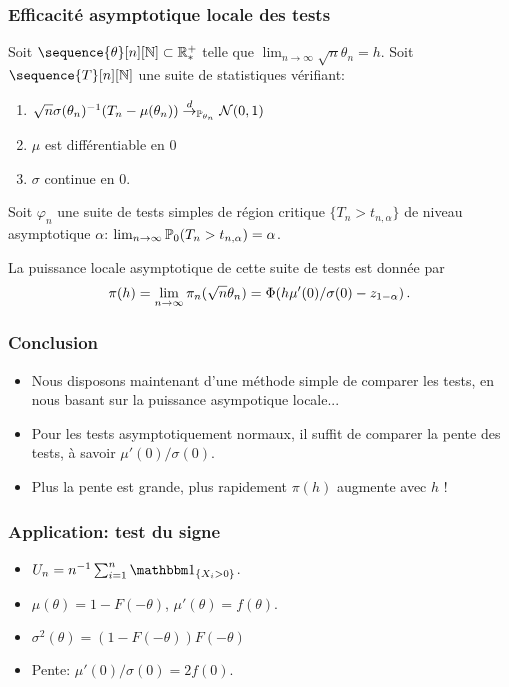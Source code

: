 \begin{frame}
\frametitle{Efficacité asymptotique locale des tests}
\begin{theo}
Soit $\sequence{\theta}[n][\nset] \subset \rset^+_*$ telle que $\lim_{n \to \infty}\sqrt{n} \theta_n = h$. 
Soit $\sequence{T}[n][\nset]$ une suite de statistiques vérifiant:  
\begin{enumerate}
\item $\sqrt{n} \sigma(\theta_n)^{-1} (T_n - \mu(\theta_n)) \stackrel{d}{\rightarrow}_{\operatorname{{\mathbb P}}_{\theta_n}} \mathcal{N}(0,1)$
\item $\mu$ est différentiable en $0$
\item $\sigma$ continue en $0$.
\end{enumerate}
Soit  $\varphi_n$ une suite de tests simples de région critique $\{ T_n > t_{n,\alpha}\}$  de niveau asymptotique $\alpha$: $\lim_{n \to \infty} \operatorname{{\mathbb P}}_{0}( T_n > t_{n,\alpha})= \alpha$. 

\bigskip

La \alert{puissance locale asymptotique} de cette suite de tests est donnée par
\[
\pi(h)= \lim_{n \to \infty} \pi_n( \sqrt{n} \theta_n)= \Phi(h
\mu'(0)/\sigma(0) - z_{1-\alpha}) \,.
\]
\end{theo}
\end{frame}

\begin{frame}
\frametitle{Conclusion}
\begin{itemize}
\item Nous disposons maintenant d'une méthode simple de comparer les tests, en nous basant sur la puissance asympotique locale...
\item Pour les tests asymptotiquement normaux, il suffit de comparer la \alert{pente} des tests, à savoir \alert{$\mu'(0)/\sigma(0)$}.
\item Plus la pente est grande,  plus rapidement $\pi(h)$ augmente avec $h$ !
\end{itemize}
\end{frame}


\begin{frame}
\frametitle{Application: test du signe}
\begin{itemize}
\item $U_n= n^{-1} \sum_{i=1}^n \indi{X_i > 0}$. 
\item $\mu(\theta)= 1 - F(-\theta)$, $\mu'(\theta)=  f(\theta)$.
\item $\sigma^2(\theta)= (1 - F(-\theta)) F(-\theta)$
\item \alert{Pente:} $\mu'(0)/\sigma(0)= 2 f(0)$.
\end{itemize}
\end{frame}

